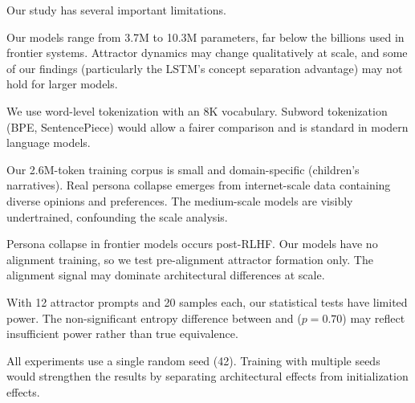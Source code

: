 Our study has several important limitations.

 Our models range from 3.7M to 10.3M parameters, far below the billions used in frontier systems. Attractor dynamics may change qualitatively at scale, and some of our findings (particularly the LSTM's concept separation advantage) may not hold for larger models.

 We use word-level tokenization with an 8K vocabulary. Subword tokenization (BPE, SentencePiece) would allow a fairer comparison and is standard in modern language models.

 Our 2.6M-token training corpus is small and domain-specific (children's narratives). Real persona collapse emerges from internet-scale data containing diverse opinions and preferences. The medium-scale models are visibly undertrained, confounding the scale analysis.

 Persona collapse in frontier models occurs post-RLHF. Our models have no alignment training, so we test pre-alignment attractor formation only. The alignment signal may dominate architectural differences at scale.

 With 12 attractor prompts and 20 samples each, our statistical tests have limited power. The non-significant entropy difference between \transformer and \gru ($p = 0.70$) may reflect insufficient power rather than true equivalence.

 All experiments use a single random seed (42). Training with multiple seeds would strengthen the results by separating architectural effects from initialization effects.
